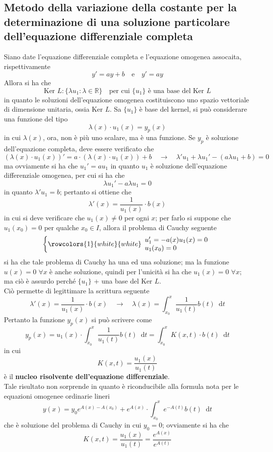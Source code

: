 \documentclass[a4paper]{extarticle}
\newcommand*\dif{\mathop{}\!\mathrm{d}}
\begin{document}
\subsection{Metodo della variazione della costante per la determinazione di una soluzione particolare dell'equazione differenziale completa}
Siano date l'equazione differenziale completa e l'equazione omogenea assocaita, rispettivamente
\[y'=a y + b \hspace{1em} \text{e} \hspace{1em} y'=ay\]
Allora si ha che
\[\text{Ker } L : \{\lambda u_1 : \lambda \in \mathbb{R}\} \hspace{1em} \text{per cui } \{u_1\} \text{ è una base del Ker } L\]
in quanto le soluzioni dell'equazione omogenea costituiscono uno spazio vettoriale di dimensione unitaria, ossia Ker $L$. Sa $\{u_1\}$ è base del kernel, si può considerare una funzione del tipo
\[\lambda(x) \cdot u_1(x) = y_p(x)\]
in cui $\lambda(x)$, ora, non è più uno scalare, ma è una funzione. Se $y_p$ è soluzione dell'equazione completa, deve essere verificato che
\[\left(\lambda(x) \cdot u_1(x)\right)' = a \cdot (\lambda(x) \cdot u_1(x)) + b \hspace{1em} \rightarrow \hspace{1em} \lambda' u_1 + \lambda u_1' - (a \lambda u_1 + b) = 0\]
ma ovviamente si ha che $u_1'=a u_1$ in quanto $u_1$ è soluzione dell'equazione differenziale omogenea, per cui si ha che
\[\lambda u_1' - a \lambda u_1 = 0\]
in quanto $\lambda' u_1 = b$; pertanto si ottiene che
\[\lambda'(x) = \dfrac{1}{u_1(x)} \cdot b(x)\]
in cui si deve verificare che $u_1(x) \neq 0$ per ogni $x$; per farlo si suppone che $u_1(x_0) = 0$ per qualche $x_0 \in I$, allora il problema di Cauchy seguente
\[\left\{
    \rowcolors{1}{white}{white}
    \begin{array}{lll}
        u_1'=-a(x) u_1(x) = 0\\
        u_1(x_0)=0
    \end{array}
\right.\]
si ha che tale problema di Cauchy ha una ed una soluzione; ma la funzione $u(x)=0$ $\forall x$ è anche soluzione, quindi per l'unicità si ha che $u_1(x) = 0$ $\forall x$; ma ciò è assurdo perché $\{u_1\}$ + una base del Ker $L$.\\
Ciò permette di legittimare la scrittura seguente
\[\lambda'(x)=\dfrac{1}{u_1(x)} \cdot b(x) \hspace{1em} \rightarrow \hspace{1em} \lambda(x) = \int_{x_0}^x \dfrac{1}{u_1(t)} b(t) \dif t\]
Pertanto la funzione $y_p(x)$ si può scrivere come
\[y_p(x) = u_1(x) \cdot \int_{x_0}^x \dfrac{1}{u_1(t)} b(t) \dif t = \int_{x_0}^x K(x,t) \cdot b(t) \dif t\]
in cui
\[K(x,t)=\dfrac{u_1(x)}{u_1(t)}\]
è il \textbf{nucleo risolvente dell'equazione differenziale}.\\
Tale risultato non sorprende in quanto è riconducibile alla formula nota per le equazioni omogenee ordinarie lineri
\[y(x)=y_0 e^{A(x) - A(x_0)} + e^{A(x)} \cdot \int_{x_0}^x e^{-A(t)} b(t) \dif t\]
che è soluzione del problema di Cauchy in cui $y_0=0$; ovviamente si ha che
\[K(x,t)=\dfrac{u_1(x)}{u_1(t)}=\dfrac{e^{A(x)}}{e^{A(t)}}\]
\end{document}
